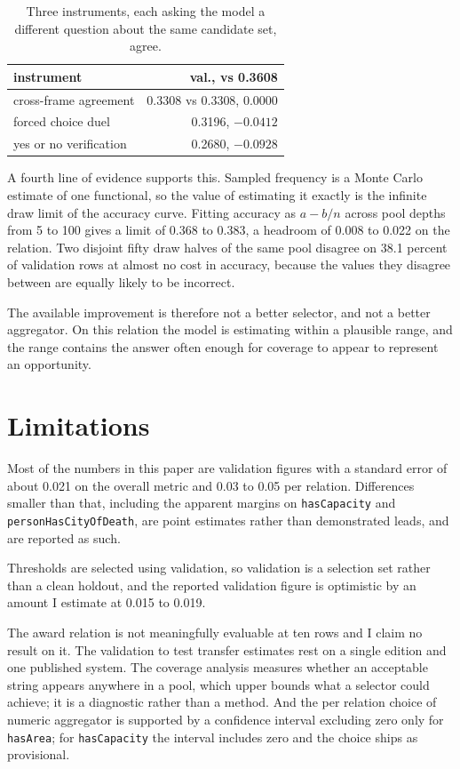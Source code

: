 \documentclass[11pt]{article}
\begin{document}
\begin{table}[t]
\centering\small
\begin{tabular}{lr}
\toprule
instrument & val., vs 0.3608 \\
\midrule
cross-frame agreement & 0.3308 vs 0.3308, 0.0000 \\
forced choice duel & 0.3196, $-0.0412$ \\
yes or no verification & 0.2680, $-0.0928$ \\
\bottomrule
\end{tabular}
\caption{Three instruments, each asking the model a different question about the
same candidate set, agree.}
\label{tab:instruments}
\end{table}

A fourth line of evidence supports this. Sampled frequency is a Monte Carlo
estimate of one functional, so the value of estimating it exactly is the infinite
draw limit of the accuracy curve. Fitting accuracy as $a - b/n$ across pool
depths from 5 to 100 gives a limit of 0.368 to 0.383, a headroom of 0.008 to
0.022 on the relation. Two disjoint fifty draw halves of the same pool disagree
on 38.1 percent of validation rows at almost no cost in accuracy, because the
values they disagree between are equally likely to be incorrect.

The available improvement is therefore not a better selector, and not a better
aggregator. On this relation the model is estimating within a plausible range,
and the range contains the answer often enough for coverage to appear to
represent an opportunity.

\section*{Limitations}

Most of the numbers in this paper are validation figures with a standard error of
about 0.021 on the overall metric and 0.03 to 0.05 per relation. Differences
smaller than that, including the apparent margins on \texttt{hasCapacity} and
\texttt{personHasCityOfDeath}, are point estimates rather than demonstrated
leads, and are reported as such.

Thresholds are selected using validation, so validation is a selection set rather
than a clean holdout, and the reported validation figure is optimistic by an
amount I estimate at 0.015 to 0.019.

The award relation is not meaningfully evaluable at ten rows and I claim no
result on it. The validation to test transfer estimates rest on a single edition
and one published system. The coverage analysis measures whether an acceptable
string appears anywhere in a pool, which upper bounds what a selector could
achieve; it is a diagnostic rather than a method. And the per relation choice of
numeric aggregator is supported by a confidence interval excluding zero only for
\texttt{hasArea}; for \texttt{hasCapacity} the interval includes zero and the
choice ships as provisional.
\end{document}
